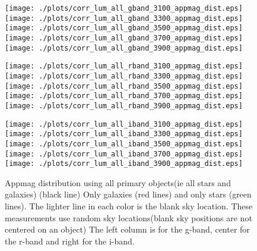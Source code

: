 \documentclass[10pt]{article}
\begin{document}
\begin{figure}
\centering
\begin{minipage}{0.32\textwidth}
 \texttt{[image: ./plots/corr\_lum\_all\_gband\_3100\_appmag\_dist.eps]}
 \texttt{[image: ./plots/corr\_lum\_all\_gband\_3300\_appmag\_dist.eps]}
 \texttt{[image: ./plots/corr\_lum\_all\_gband\_3500\_appmag\_dist.eps]}
 \texttt{[image: ./plots/corr\_lum\_all\_gband\_3700\_appmag\_dist.eps]}
 \texttt{[image: ./plots/corr\_lum\_all\_gband\_3900\_appmag\_dist.eps]}
\end{minipage}
 \begin{minipage}{0.32\textwidth}
 \texttt{[image: ./plots/corr\_lum\_all\_rband\_3100\_appmag\_dist.eps]}
 \texttt{[image: ./plots/corr\_lum\_all\_rband\_3300\_appmag\_dist.eps]}
 \texttt{[image: ./plots/corr\_lum\_all\_rband\_3500\_appmag\_dist.eps]}
 \texttt{[image: ./plots/corr\_lum\_all\_rband\_3700\_appmag\_dist.eps]}
 \texttt{[image: ./plots/corr\_lum\_all\_rband\_3900\_appmag\_dist.eps]}
\end{minipage}
\begin{minipage}{0.32\textwidth}
 \texttt{[image: ./plots/corr\_lum\_all\_iband\_3100\_appmag\_dist.eps]}
 \texttt{[image: ./plots/corr\_lum\_all\_iband\_3300\_appmag\_dist.eps]}
 \texttt{[image: ./plots/corr\_lum\_all\_iband\_3500\_appmag\_dist.eps]}
 \texttt{[image: ./plots/corr\_lum\_all\_iband\_3700\_appmag\_dist.eps]}
 \texttt{[image: ./plots/corr\_lum\_all\_iband\_3900\_appmag\_dist.eps]}
\end{minipage}
\caption{Appmag distribution using all primary objects(ie all stars and galaxies) (black line) 
Only galaxies (red lines) and only stars (green lines).
The lighter line in each color is the blank sky location.
These measurements use random sky locations(blank sky positions are not centered on an object)
The left column is for the g-band, center for the r-band and right for the i-band.
}
\end{figure}
\end{document}
